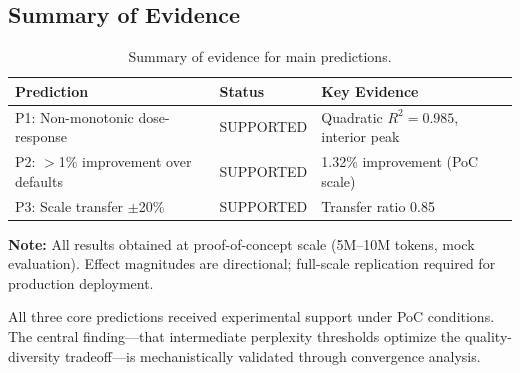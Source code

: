 \subsection{Summary of Evidence}

\begin{table}[h]
\centering
\caption{Summary of evidence for main predictions.}
\label{tab:summary}
\begin{tabular}{@{}lll@{}}
\toprule
Prediction & Status & Key Evidence \\
\midrule
P1: Non-monotonic dose-response & SUPPORTED & Quadratic $R^2=0.985$, interior peak \\
P2: $>$1\% improvement over defaults & SUPPORTED & 1.32\% improvement (PoC scale) \\
P3: Scale transfer $\pm$20\% & SUPPORTED & Transfer ratio 0.85 \\
\bottomrule
\end{tabular}
\end{table}

\textbf{Note:} All results obtained at proof-of-concept scale (5M--10M tokens, mock evaluation). Effect magnitudes are directional; full-scale replication required for production deployment.

All three core predictions received experimental support under PoC conditions. The central finding---that intermediate perplexity thresholds optimize the quality-diversity tradeoff---is mechanistically validated through convergence analysis.
